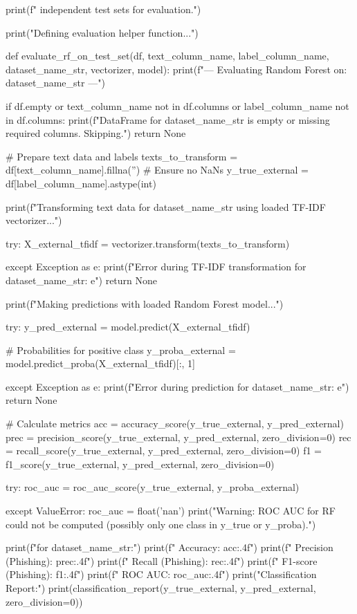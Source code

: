 \begin{ffcode}
print(f" independent test sets for evaluation.")

print("Defining evaluation helper function...")

def evaluate_rf_on_test_set(df, text_column_name, label_column_name, dataset_name_str, vectorizer, model):
    print(f"\n--- Evaluating Random Forest on: {dataset_name_str} ---")

    if df.empty or text_column_name not in df.columns or label_column_name not in df.columns:
        print(f"DataFrame for {dataset_name_str} is empty or missing required columns. Skipping.")
        return None

    # Prepare text data and labels
    texts_to_transform = df[text_column_name].fillna('') # Ensure no NaNs
    y_true_external = df[label_column_name].astype(int)

    print(f"Transforming text data for {dataset_name_str} using loaded TF-IDF vectorizer...")

    try:
        X_external_tfidf = vectorizer.transform(texts_to_transform)

    except Exception as e:
        print(f"Error during TF-IDF transformation for {dataset_name_str}: {e}")
        return None

    print(f"Making predictions with loaded Random Forest model...")

    try:
        y_pred_external = model.predict(X_external_tfidf)

        # Probabilities for positive class
        y_proba_external = model.predict_proba(X_external_tfidf)[:, 1]

    except Exception as e:
        print(f"Error during prediction for {dataset_name_str}: {e}")
        return None

    # Calculate metrics
    acc = accuracy_score(y_true_external, y_pred_external)
    prec = precision_score(y_true_external, y_pred_external, zero_division=0)
    rec = recall_score(y_true_external, y_pred_external, zero_division=0)
    f1 = f1_score(y_true_external, y_pred_external, zero_division=0)

    try:
        roc_auc = roc_auc_score(y_true_external, y_proba_external)

    except ValueError:
        roc_auc = float('nan')
        print("Warning: ROC AUC for RF could not be computed (possibly only one class in y_true or y_proba).")

    print(f"\nResults for {dataset_name_str}:")
    print(f"  Accuracy:  {acc:.4f}")
    print(f"  Precision (Phishing): {prec:.4f}")
    print(f"  Recall (Phishing):    {rec:.4f}")
    print(f"  F1-score (Phishing):  {f1:.4f}")
    print(f"  ROC AUC:   {roc_auc:.4f}")
    print("\n  Classification Report:")
    print(classification_report(y_true_external, y_pred_external, zero_division=0))


\end{ffcode}
